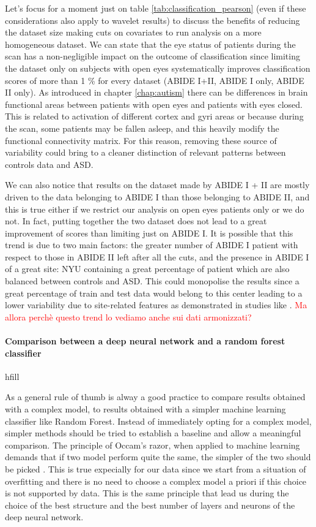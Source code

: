 \documentclass[11pt]{report}
\begin{document}
Let's focus for a moment just on table \ref{tab:classification_pearson} (even if these considerations also apply to wavelet results) to discuss the benefits of reducing the dataset size making cuts on covariates to run analysis on a more homogeneous dataset.
We can state that the eye status of patients during the scan has a non-negligible impact on the outcome of classification since limiting the dataset only on subjects with open eyes systematically improves classification scores of more than 1 \% for every dataset (ABIDE I+II, ABIDE I only, ABIDE II only).
As introduced in chapter \ref{chap:autism} there can be differences in brain functional areas between patients with open eyes and patients with eyes closed.
This is related to activation of different cortex and gyri areas or because during the scan, some patients may be fallen asleep, and this heavily modify the functional connectivity matrix.
For this reason, removing these source of variability could bring to a cleaner distinction of relevant patterns between controls data and ASD.

We can also notice that results on the dataset made by ABIDE I + II are mostly driven to the data belonging to ABIDE I than those belonging to ABIDE II, and this is true either if we restrict our analysis on open eyes patients only or we do not.
In fact, putting together the two dataset does not lead to a great improvement of scores than limiting just on ABIDE I.
It is possible that this trend is due to two main factors: the greater number of ABIDE I patient with respect to those in ABIDE II left after all the cuts, and the presence in ABIDE I of a great site: NYU containing a great percentage of patient which are also balanced between controls and ASD.
This could monopolise the results since a great percentage of train and test data would belong to this center leading to a lower variability due to site-related features as demonstrated in studies like \cite{spera-2019}.
\textcolor{red}{Ma allora perchè questo trend lo vediamo anche sui dati armonizzati?}


\paragraph{Comparison between a deep neural network and a random forest classifier}hfill

As a general rule of thumb is alway a good practice to compare results obtained with a complex model, to results obtained with a simpler machine learning classifier like Random Forest.
Instead of immediately opting for a complex model, simpler methods should be tried to establish a baseline and allow a meaningful comparison.
The principle of Occam's razor, when applied to machine learning demands that if two model perform quite the same, the simpler of the two should be picked \cite{domingos-1999}.
This is true expecially for our data since we start from a situation of overfitting and there is no need to choose a complex model a priori if this choice is not supported by data.
This is the same principle that lead us during the choice of the best structure and the best number of layers and neurons of the deep neural network.
\end{document}
